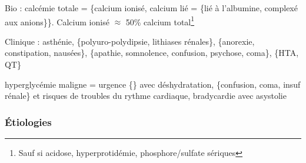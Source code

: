 \documentclass[11pt]{article}
\begin{document}
Bio : calcémie totale = \{calcium ionisé, calcium lié = \{lié à l'albumine,
complexé aux anions\}\}. Calcium ionisé \(\approx\) 50\% calcium total\footnote{Sauf si acidose, hyperprotidémie, \inc phosphore/sulfate sériques}

Clinique : asthénie, \{polyuro-polydipsie, lithiases rénales\}, \{anorexie,
constipation, nausées\}, \{apathie, somnolence, confusion, psychose, coma\}, \{HTA,
\dec QT\}

\danger hyperglycémie maligne = urgence \{\} avec déshydratation, \{confusion,
coma, insuf rénale\} et risques de troubles du rythme cardiaque, bradycardie avec asystolie

\subsubsection{Étiologies}
\label{sec:orgea34c39}
\end{document}

